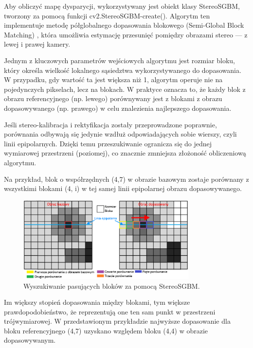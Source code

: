 \documentclass[magisterska]{pracadypl}
\begin{document}
Aby obliczyć mapę dysparycji, wykorzystywany jest obiekt klasy StereoSGBM, tworzony za pomocą funkcji cv2.StereoSGBM-create(). Algorytm ten implementuje metodę półglobalnego dopasowania blokowego (Semi-Global Block Matching) \cite{semi-global}, która umożliwia estymację przesunięć pomiędzy obrazami stereo — z lewej i prawej kamery.

Jednym z kluczowych parametrów wejściowych algorytmu jest rozmiar bloku, który określa wielkość lokalnego sąsiedztwa wykorzystywanego do dopasowania. W przypadku, gdy wartość ta jest większa niż 1, algorytm operuje nie na pojedynczych pikselach, lecz na blokach. W praktyce oznacza to, że każdy blok z obrazu referencyjnego (np. lewego) porównywany jest z blokami z obrazu dopasowywanego (np. prawego) w celu znalezienia najlepszego dopasowania.

Jeśli stereo-kalibracja i rektyfikacja zostały przeprowadzone poprawnie, porównania odbywają się jedynie wzdłuż odpowiadających sobie wierszy, czyli linii epipolarnych. Dzięki temu przeszukiwanie ogranicza się do jednej wymiarowej przestrzeni (poziomej), co znacznie zmniejsza złożoność obliczeniową algorytmu.

Na przykład, blok o współrzędnych (4,7) w obrazie bazowym zostaje porównany z wszystkimi blokami (4, i) w tej samej linii epipolarnej obrazu dopasowywanego.

\begin{figure}[H]
\centering
\includegraphics[width=0.8\textwidth]{images/dopracy1.png}
\captionsetup{font=footnotesize}
\caption[Wyszukiwanie pasujących bloków za pomocą StereoSGBM. Opracowanie własne.]{Wyszukiwanie pasujących bloków za pomocą StereoSGBM.}
\end{figure}

Im większy stopień dopasowania między blokami, tym większe prawdopodobieństwo, że reprezentują one ten sam punkt w przestrzeni trójwymiarowej. W przedstawionym przykładzie najwyższe dopasowanie dla bloku referencyjnego (4,7) uzyskano względem bloku (4,4) w obrazie dopasowywanym.
\end{document}
